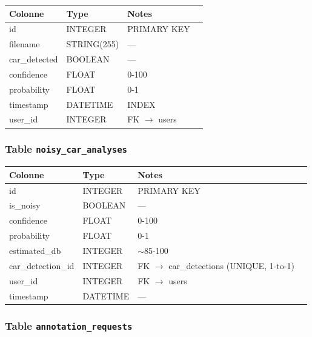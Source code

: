 \documentclass[11pt,a4paper]{article}
\begin{document}
\begin{table}[htbp]
\centering
\begin{tabular}{@{}llll@{}}
\toprule
\textbf{Colonne} & \textbf{Type} & \textbf{Notes} \\
\midrule
id & INTEGER & PRIMARY KEY \\
filename & STRING(255) & — \\
car\_detected & BOOLEAN & — \\
confidence & FLOAT & 0-100 \\
probability & FLOAT & 0-1 \\
timestamp & DATETIME & INDEX \\
user\_id & INTEGER & FK $\rightarrow$ users \\
\bottomrule
\end{tabular}
\end{table}

\subsubsection{Table \texttt{noisy\_car\_analyses}}

\begin{table}[htbp]
\centering
\begin{tabular}{@{}llll@{}}
\toprule
\textbf{Colonne} & \textbf{Type} & \textbf{Notes} \\
\midrule
id & INTEGER & PRIMARY KEY \\
is\_noisy & BOOLEAN & — \\
confidence & FLOAT & 0-100 \\
probability & FLOAT & 0-1 \\
estimated\_db & INTEGER & $\sim$85-100 \\
car\_detection\_id & INTEGER & FK $\rightarrow$ car\_detections (UNIQUE, 1-to-1) \\
user\_id & INTEGER & FK $\rightarrow$ users \\
timestamp & DATETIME & — \\
\bottomrule
\end{tabular}
\end{table}

\subsubsection{Table \texttt{annotation\_requests}}
\end{document}
